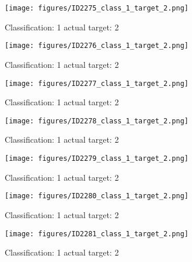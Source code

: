 \begin{figure}[h!]
\begin{center}
\texttt{[image: figures/ID2275\_class\_1\_target\_2.png]}
\end{center}
\caption{ Classification: 1 actual target: 2}
\label{fig:ID2275_class_1_target_2}
\end{figure}
\begin{figure}[h!]
\begin{center}
\texttt{[image: figures/ID2276\_class\_1\_target\_2.png]}
\end{center}
\caption{ Classification: 1 actual target: 2}
\label{fig:ID2276_class_1_target_2}
\end{figure}
\begin{figure}[h!]
\begin{center}
\texttt{[image: figures/ID2277\_class\_1\_target\_2.png]}
\end{center}
\caption{ Classification: 1 actual target: 2}
\label{fig:ID2277_class_1_target_2}
\end{figure}
\begin{figure}[h!]
\begin{center}
\texttt{[image: figures/ID2278\_class\_1\_target\_2.png]}
\end{center}
\caption{ Classification: 1 actual target: 2}
\label{fig:ID2278_class_1_target_2}
\end{figure}
\begin{figure}[h!]
\begin{center}
\texttt{[image: figures/ID2279\_class\_1\_target\_2.png]}
\end{center}
\caption{ Classification: 1 actual target: 2}
\label{fig:ID2279_class_1_target_2}
\end{figure}
\begin{figure}[h!]
\begin{center}
\texttt{[image: figures/ID2280\_class\_1\_target\_2.png]}
\end{center}
\caption{ Classification: 1 actual target: 2}
\label{fig:ID2280_class_1_target_2}
\end{figure}
\begin{figure}[h!]
\begin{center}
\texttt{[image: figures/ID2281\_class\_1\_target\_2.png]}
\end{center}
\caption{ Classification: 1 actual target: 2}
\label{fig:ID2281_class_1_target_2}
\end{figure}
